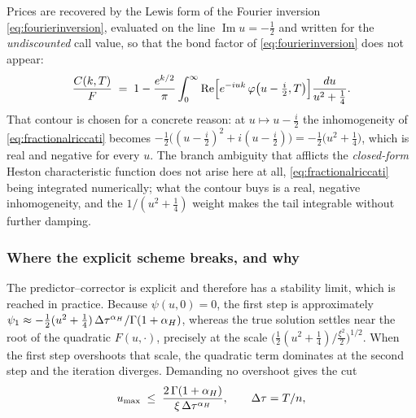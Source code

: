 
Prices are recovered by the Lewis form of the Fourier inversion \eqref{eq:fourierinversion},
evaluated on the line $\operatorname{Im}u=-\tfrac12$ and written for the \emph{undiscounted} call
value, so that the bond factor of \eqref{eq:fourierinversion} does not appear:
\begin{equation}\label{eq:lewis}
  \frac{C(k,T)}{F}
  \;=\;1-\frac{e^{k/2}}{\pi}\int_{0}^{\infty}
  \operatorname{Re}\Bigl[e^{-iuk}\,\varphi\bigl(u-\tfrac i2,T\bigr)\Bigr]\frac{d u}{u^{2}+\tfrac14}.
\end{equation}
That contour is chosen for a concrete reason: at $u\mapsto u-\tfrac i2$ the inhomogeneity of
\eqref{eq:fractionalriccati} becomes
$-\tfrac12\bigl((u-\tfrac i2)^{2}+i(u-\tfrac i2)\bigr)=-\tfrac12\bigl(u^{2}+\tfrac14\bigr)$, which is
real and negative for every $u$. The branch ambiguity that afflicts the \emph{closed-form} Heston
characteristic function does not arise here at all, \eqref{eq:fractionalriccati} being integrated
numerically; what the contour buys is a real, negative inhomogeneity, and the
$1/(u^{2}+\tfrac14)$ weight makes the tail integrable without further damping.

\vspace{-0.42cm}

\subsubsection*{Where the explicit scheme breaks, and why}

\vspace{-0.42cm}

The predictor--corrector is explicit and therefore has a stability limit, which is reached in
practice. Because $\psi(u,0)=0$, the first step is
approximately $\psi_{1}\approx-\tfrac12(u^{2}+\tfrac14)\,\Delta\tau^{\alpha_{H}}/\Gamma(1+\alpha_{H})$, whereas the true solution settles near the root of the quadratic $F(u,\cdot)$, precisely at the scale
$\bigl(\tfrac12(u^{2}+\tfrac14)\big/\tfrac{\xi^{2}}{2}\bigr)^{1/2}$. When the first step overshoots
that scale, the quadratic term dominates at the second step and the iteration diverges. Demanding no
overshoot gives the cut
\begin{equation}\label{eq:ustab}
  u_{\max}\;\le\;\frac{2\,\Gamma(1+\alpha_{H})}{\xi\,\Delta\tau^{\alpha_{H}}},
  \qquad \Delta\tau=T/n ,
\end{equation}

